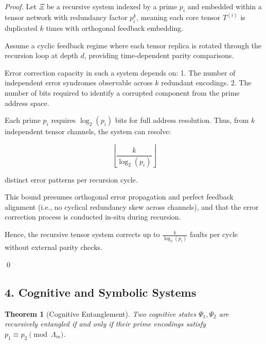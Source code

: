 \documentclass{article}
\theoremstyle{plain}
\newtheorem{theorem}{Theorem}
\begin{document}
\begin{proof}
Let \( \Xi \) be a recursive system indexed by a prime \( p_i \) and embedded within a tensor network with redundancy factor \( p_i^k \), meaning each core tensor \( T^{(i)} \) is duplicated \( k \) times with orthogonal feedback embedding.

Assume a cyclic feedback regime where each tensor replica is rotated through the recursion loop at depth \( d \), providing time-dependent parity comparisons.

Error correction capacity in such a system depends on:
1. The number of independent error syndromes observable across \( k \) redundant encodings.
2. The number of bits required to identify a corrupted component from the prime address space.

Each prime \( p_i \) requires \( \log_2(p_i) \) bits for full address resolution. Thus, from \( k \) independent tensor channels, the system can resolve:

\[
\left\lfloor \frac{k}{\log_2(p_i)} \right\rfloor
\]

distinct error patterns per recursion cycle.

This bound presumes orthogonal error propagation and perfect feedback alignment (i.e., no cyclical redundancy skew across channels), and that the error correction process is conducted in-situ during recursion.

Hence, the recursive tensor system corrects up to \( \boxed{\frac{k}{\log_2(p_i)}} \) faults per cycle without external parity checks.

\qed
\end{proof}

\subsection{4. Cognitive and Symbolic Systems}

\begin{theorem}[Cognitive Entanglement]
Two cognitive states \( \Psi_1, \Psi_2 \) are recursively entangled if and only if their prime encodings satisfy \( p_1 \equiv p_2 \pmod{\Lambda_m} \).
\end{theorem}
\end{document}
